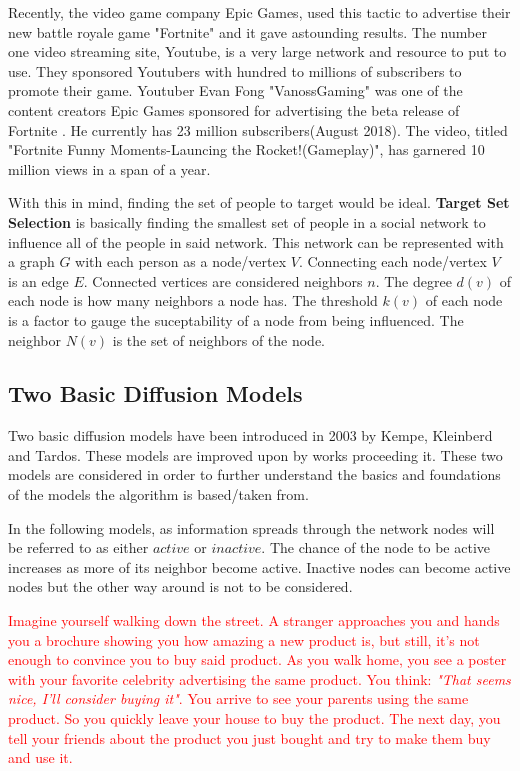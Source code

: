 Recently, the video game company Epic Games, used this tactic to advertise their new battle royale game "Fortnite" and it gave astounding results. The number one video streaming site, Youtube, is a very large network and resource to put to use. They sponsored Youtubers with hundred to millions of subscribers to promote their game.\cite{sponsoredvideos} Youtuber Evan Fong "VanossGaming" was one of the content creators Epic Games sponsored for advertising the beta release of Fortnite \cite{vanoss}. He currently has 23 million subscribers(August 2018). The video, titled "Fortnite Funny Moments-Launcing the Rocket!(Gameplay)", has garnered 10 million views in a span of a year.

With this in mind, finding the set of people to target would be ideal. \textbf{Target Set Selection} is basically finding the smallest set of people in a social network to influence all of the people in said network.\cite{Kempe,chen,Shakarian:2012:LSN:2456719.2457081} This network can be represented with a graph $G$ with each person as a node/vertex $V$. Connecting each node/vertex $V$ is an edge $E$. Connected vertices are considered neighbors $n$. The degree $d(v)$ of each node is how many neighbors a node has. The threshold $k(v)$ of each node is a factor to gauge the suceptability of a node from being influenced. The neighbor $N(v)$ is the set of neighbors of the node. 

\subsection{Two Basic Diffusion Models}
Two basic diffusion models have been introduced in 2003 by Kempe, Kleinberd and Tardos.\cite{Kempe} These models are improved upon by works proceeding it. These two models are considered in order to further understand the basics and foundations of the models the algorithm is based/taken from.


In the following models, as information spreads through the network nodes will be referred to as either $active$ or $inactive$. The chance of the node to be active increases as more of its neighbor become active. Inactive nodes can become active nodes but the other way around is not to be considered. 

\textcolor{red}{
Imagine yourself walking down the street. A stranger approaches you and hands you a brochure showing you how amazing a new product is, but still, it's not enough to convince you to buy said product. As you walk home, you see a poster with your favorite celebrity advertising the same product. You think: \textit{"That seems nice, I'll consider buying it"}. You arrive to see your parents using the same product. So you quickly leave your house to buy the product. The next day, you tell your friends about the product you just bought and try to make them buy and use it.}

